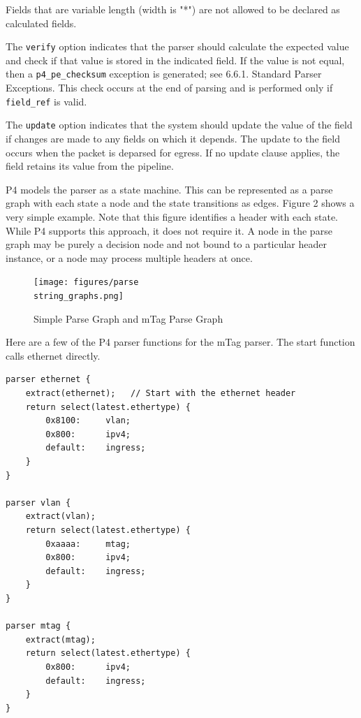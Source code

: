 \documentclass[12pt]{article}
\begin{document}
Fields that are variable length (width is "*") are not allowed to be declared
as calculated fields.

The \texttt{verify} option indicates that the parser should calculate the expected
value and check if that value is stored in the indicated field. If the value
is not equal, then a \texttt{p4_pe_checksum} exception is generated; see 6.6.1.
Standard Parser Exceptions. This check occurs at the end of parsing and is
performed only if \texttt{field_ref} is valid.

The \texttt{update} option indicates that the system should update the value of the
field if changes are made to any fields on which it depends. The update to
the field occurs when the packet is deparsed for egress. If no update clause
applies, the field retains its value from the \matchaction pipeline.


P4 models the parser as a state machine. This can be represented as a parse
graph with each state a node and the state transitions as edges. Figure 2
shows a very simple example. Note that this figure identifies a header with
each state. While P4 supports this approach, it does not require it. A node
in the parse graph may be purely a decision node and not bound to a particular
header instance, or a node may process multiple headers at once.



\begin{figure}[h!]
    \centering
    \texttt{[image: figures/parse\\string\_graphs.png]}
    \caption{Simple Parse Graph and mTag Parse Graph}
    \label{fig:parsegraphs}
\end{figure}


Here are a few of the P4 parser functions for the mTag parser. The
start function calls ethernet directly.

\begin{lstlisting}[keywords={},frame=single,escapechar=\@]
parser ethernet {
    extract(ethernet);   // Start with the ethernet header
    return select(latest.ethertype) {
        0x8100:     vlan;
        0x800:      ipv4;
        default:    ingress;
    }
}

parser vlan {
    extract(vlan);
    return select(latest.ethertype) {
        0xaaaa:     mtag;
        0x800:      ipv4;
        default:    ingress;
    }
}

parser mtag {
    extract(mtag);
    return select(latest.ethertype) {
        0x800:      ipv4;
        default:    ingress;
    }
}
\end{lstlisting}
\end{document}
